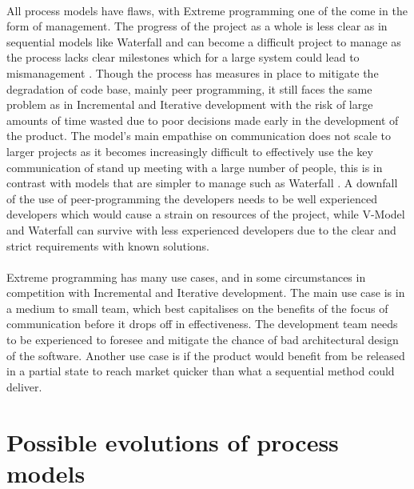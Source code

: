 \documentclass{style/CRPITStyle}
\renewcommand{\cite}{\citep}
\begin{document}
\paragraph{}
All process models have flaws, with Extreme programming one of the come in the
form of management. The progress of the project as a whole is less clear as in
sequential models like Waterfall and can become a difficult project to manage
as the process lacks clear milestones which for a large system could lead to
mismanagement \cite{khramtchenko:2004:xp}. Though the process has measures in
place to mitigate the degradation of code base, mainly peer programming, it 
still faces the same problem as in Incremental and Iterative development with
the risk of large amounts of time wasted due to poor decisions made early in the
development of the product. The model's main empathise on communication does not
scale to larger projects as it becomes increasingly difficult to effectively
use the key communication of stand up meeting with a large number of people,
this is in contrast with models that are simpler to manage such as 
Waterfall \cite{khramtchenko:2004:xp}.
A downfall of the use of peer-programming the developers needs to be well
experienced developers which would cause a strain on resources of the project,
while V-Model and Waterfall can survive with less experienced developers due to the clear and
strict requirements with known solutions.

\paragraph{}
Extreme programming has many use cases, and in some circumstances in competition 
with Incremental and Iterative development. The main use case is in a medium to
small team, which best capitalises on the benefits of the focus of communication
before it drops off in effectiveness. The development team needs to be
experienced to foresee and mitigate the chance of bad architectural design of
the software. Another use case is if the product would benefit 
from be released in a partial state to reach market quicker 
than what a sequential method could deliver.

\section{Possible evolutions of process models}
\end{document}
